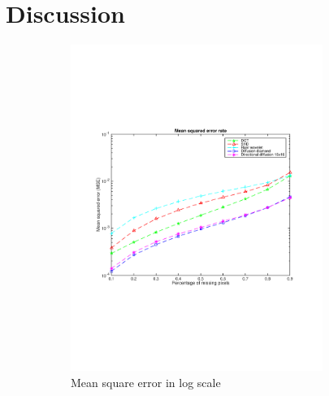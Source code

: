 \section{Discussion}
\label{sec:discussion}

\begin{figure}
	\centering
	\begin{subfigure}[b]{0.49\textwidth}
		\centering
		\includegraphics[clip, trim=2cm 7cm 2cm 6cm, width=0.9\textwidth]{figures/mse_vector}
		\caption{Mean square error in log scale}
		\label{fig:err_random}
	\end{subfigure}
	\begin{subfigure}[b]{0.49\textwidth}
		\centering

\end{subfigure}
\end{figure}
